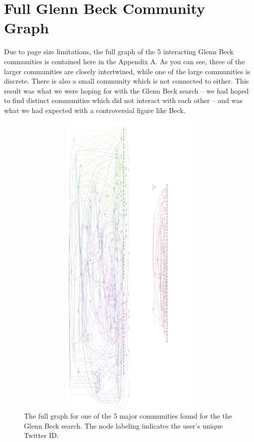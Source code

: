 \appendix   
\section{Full Glenn Beck Community Graph}
Due to page size limitations, the full graph of the 5 interacting Glenn Beck communities is contained here in the Appendix A.  As you can see, three of the larger communities are closely intertwined, while one of the large communities is discrete.  There is also a small community which is not connected to either.  This result was what we were hoping for with the Glenn Beck search -- we had hoped to find distinct communities which did not interact with each other -- and was what we had expected with a controversial figure like Beck.
\begin{figure}
  \begin{center}
  \includegraphics[height=6in,width=6in]{figures/GBFull.jpg}
  \end{center}
  \caption{The full graph for one of the 5 major communities found for the the Glenn Beck search.  The node labeling indicates the user's unique Twitter ID.}
  \label{figure:gbAppend}
\end{figure}
